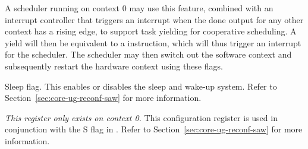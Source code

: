 A scheduler running on context 0 may use this feature, combined with an
interrupt controller that triggers an interrupt when the done output for any
other context has a rising edge, to support task yielding for cooperative
scheduling. A yield will then be equivalent to a  instruction, which
will thus trigger an interrupt for the scheduler. The scheduler may then
switch out the software context and subsequently restart the hardware context
using these flags.

\debugCanWrite{}
\coreCanWrite{}
Sleep flag. This enables or disables the sleep and wake-up system. Refer to
Section~\ref{sec:core-ug-reconf-saw} for more information.


\emph{This register only exists on context 0.} This configuration register is 
used in conjunction with the S flag in . Refer to
Section~\ref{sec:core-ug-reconf-saw} for more information.

\coreCanWrite{}
\debugCanWrite{}

